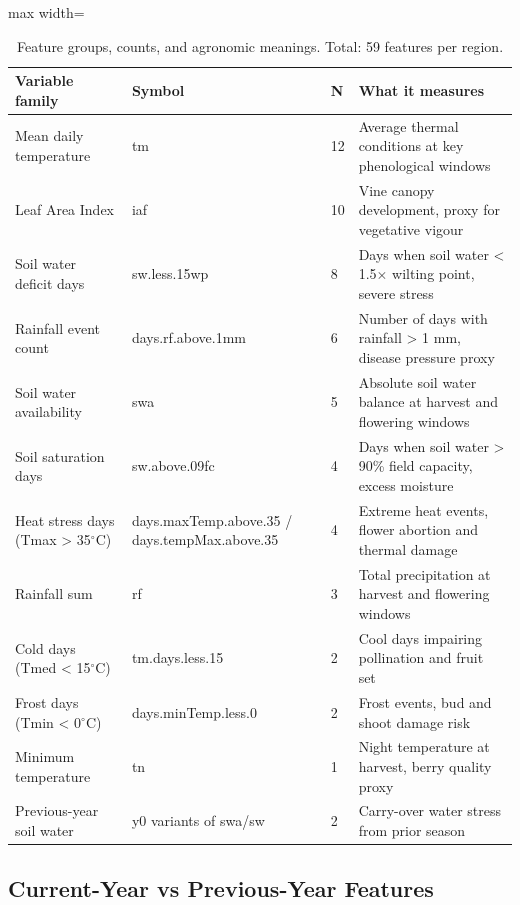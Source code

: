 \begin{table}[htbp]
  \centering
  \caption{Feature groups, counts, and agronomic meanings. Total: 59 features per region.}\label{tab:ch3d_5}
  \small
  \begin{adjustbox}{max width=\textwidth}
    \begin{tabularx}{\textwidth}{X|p{4cm}|p{1cm}|p{4.5cm}}
  \toprule
  \textbf{Variable family} & \textbf{Symbol} & \textbf{N} & \textbf{What it measures} \\
  \midrule
  Mean daily temperature & tm & 12 & Average thermal conditions at key phenological windows \\
  Leaf Area Index & iaf & 10 & Vine canopy development, proxy for vegetative vigour \\
  Soil water deficit days & sw.less.15wp & 8 & Days when soil water < 1.5$\times$ wilting point, severe stress \\
  Rainfall event count & days.rf.above.1mm & 6 & Number of days with rainfall > 1 mm, disease pressure proxy \\
  Soil water availability & swa & 5 & Absolute soil water balance at harvest and flowering windows \\
  Soil saturation days & sw.above.09fc & 4 & Days when soil water > 90\% field capacity, excess moisture \\
  Heat stress days (Tmax > 35$^\circ$C) & days.maxTemp.above.35 / days.tempMax.above.35 & 4 & Extreme heat events, flower abortion and thermal damage \\
  Rainfall sum & rf & 3 & Total precipitation at harvest and flowering windows \\
  Cold days (Tmed < 15$^\circ$C) & tm.days.less.15 & 2 & Cool days impairing pollination and fruit set \\
  Frost days (Tmin < 0$^\circ$C) & days.minTemp.less.0 & 2 & Frost events, bud and shoot damage risk \\
  Minimum temperature & tn & 1 & Night temperature at harvest, berry quality proxy \\
  Previous-year soil water & y0 variants of swa/sw & 2 & Carry-over water stress from prior season \\
  \bottomrule
\end{tabularx}
  \end{adjustbox}

\end{table}



\subsection{Current-Year vs Previous-Year Features}\label{sub:currentyear_vs_previousyear_features}


